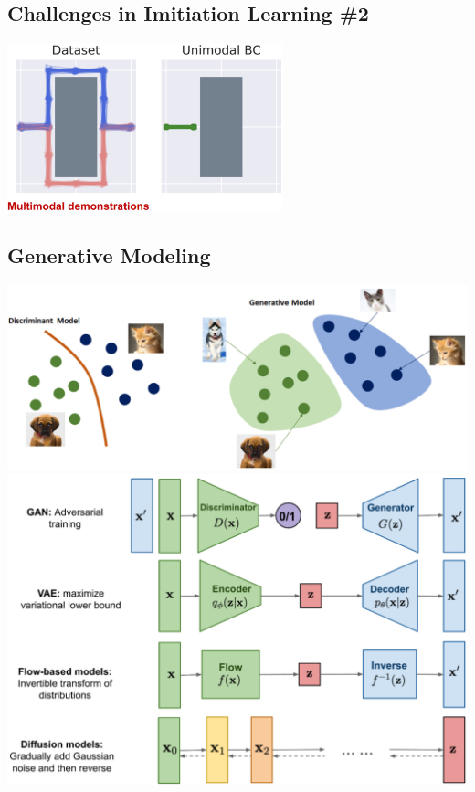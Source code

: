 \documentclass[10pt]{article}
\begin{document}
\subsection*{Challenges in Imitiation Learning \#2}
\begin{center}
    \includegraphics*[width=0.6\textwidth]{L2_16.png}
\end{center}

\subsection*{Generative Modeling}
\begin{center}
    \includegraphics*[width=\textwidth]{L2_17.png} \\
    \includegraphics*[width=\textwidth]{L2_18.png}
\end{center}
\end{document}
